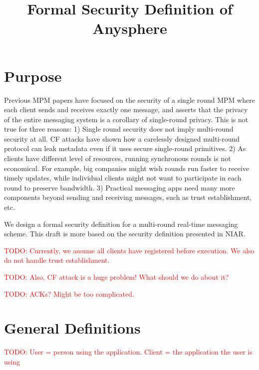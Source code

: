 \documentclass[sigconf, nonacm, balance=false, natbib=false, screen]{acmart}
\title{Formal Security Definition of Anysphere}
\newcommand\todo[1]{\textcolor{red}{TODO: #1}}
\begin{document}
\maketitle
\section{Purpose}
Previous MPM papers have focused on the security of a single round MPM where each client sends and receives exactly one message, and asserts that the privacy of the entire messaging system is a corollary of single-round privacy. This is not true for three reasons: 1) Single round security does not imply multi-round security at all. CF attacks have shown how a carelessly designed multi-round protocol can leak metadata even if it uses secure single-round primitives. 2) As clients have different level of resources, running synchronous rounds is not economical. For example, big companies might wish rounds run faster to receive timely updates, while individual clients might not want to participate in each round to preserve bandwidth. 3) Practical messaging apps need many more components beyond sending and receiving messages, such as trust establishment, etc. 

We design a formal security definition for a multi-round real-time messaging scheme. This draft is more based on the security definition presented in NIAR. 

\todo{Currently, we assume all clients have registered before execution. We also do not handle trust establishment.}

\todo{Also, CF attack is a huge problem! What should we do about it?}

\todo{ACKs? Might be too complicated.}
\section{General Definitions}
\todo{User = person using the application. Client = the application the user is using}
\end{document}
